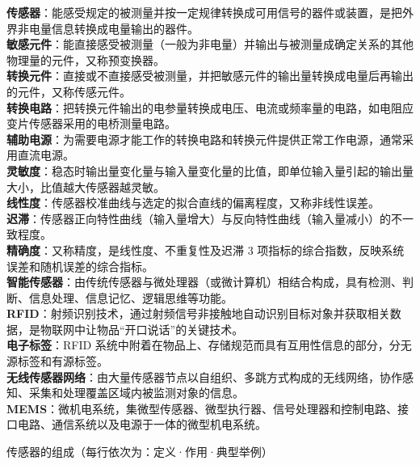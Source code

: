 \documentclass[a4paper,11pt]{article}
\begin{document}
\begin{keyterms}
\textbf{传感器}：能感受规定的被测量并按一定规律转换成可用信号的器件或装置，是把外界非电量信息转换成电量输出的器件。\\
\textbf{敏感元件}：能直接感受被测量（一般为非电量）并输出与被测量成确定关系的其他物理量的元件，又称预变换器。\\
\textbf{转换元件}：直接或不直接感受被测量，并把敏感元件的输出量转换成电量后再输出的元件，又称传感元件。\\
\textbf{转换电路}：把转换元件输出的电参量转换成电压、电流或频率量的电路，如电阻应变片传感器采用的电桥测量电路。\\
\textbf{辅助电源}：为需要电源才能工作的转换电路和转换元件提供正常工作电源，通常采用直流电源。\\
\textbf{灵敏度}：稳态时输出量变化量与输入量变化量的比值，即单位输入量引起的输出量大小，比值越大传感器越灵敏。\\
\textbf{线性度}：传感器校准曲线与选定的拟合直线的偏离程度，又称非线性误差。\\
\textbf{迟滞}：传感器正向特性曲线（输入量增大）与反向特性曲线（输入量减小）的不一致程度。\\
\textbf{精确度}：又称精度，是线性度、不重复性及迟滞 3 项指标的综合指数，反映系统误差和随机误差的综合指标。\\
\textbf{智能传感器}：由传统传感器与微处理器（或微计算机）相结合构成，具有检测、判断、信息处理、信息记忆、逻辑思维等功能。\\
\textbf{RFID}：射频识别技术，通过射频信号非接触地自动识别目标对象并获取相关数据，是物联网中让物品“开口说话”的关键技术。\\
\textbf{电子标签}：RFID 系统中附着在物品上、存储规范而具有互用性信息的部分，分无源标签和有源标签。\\
\textbf{无线传感器网络}：由大量传感器节点以自组织、多跳方式构成的无线网络，协作感知、采集和处理覆盖区域内被监测对象的信息。\\
\textbf{MEMS}：微机电系统，集微型传感器、微型执行器、信号处理器和控制电路、接口电路、通信系统以及电源于一体的微型机电系统。
\end{keyterms}

\needspace{6cm}
\begin{contrast}{传感器的组成（每行依次为：定义·作用·典型举例）}
\end{contrast}
\end{document}
